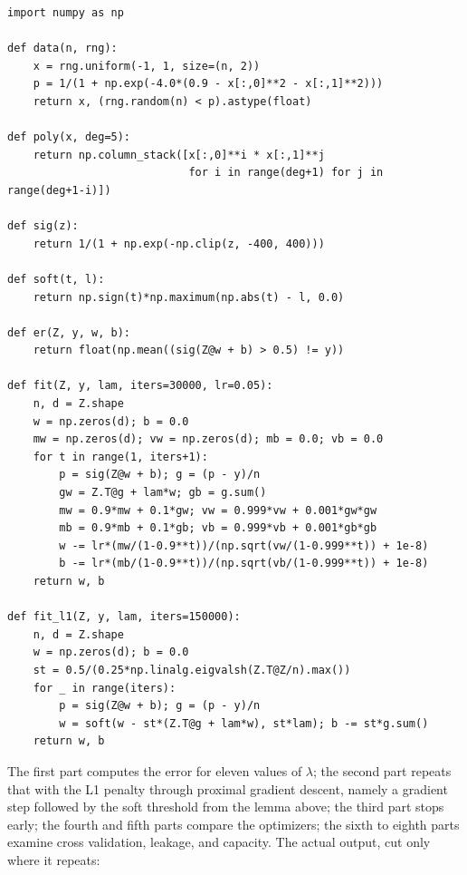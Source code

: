 \begin{lab}
\begin{verbatim}
import numpy as np

def data(n, rng):
    x = rng.uniform(-1, 1, size=(n, 2))
    p = 1/(1 + np.exp(-4.0*(0.9 - x[:,0]**2 - x[:,1]**2)))
    return x, (rng.random(n) < p).astype(float)

def poly(x, deg=5):
    return np.column_stack([x[:,0]**i * x[:,1]**j
                            for i in range(deg+1) for j in range(deg+1-i)])

def sig(z):
    return 1/(1 + np.exp(-np.clip(z, -400, 400)))

def soft(t, l):
    return np.sign(t)*np.maximum(np.abs(t) - l, 0.0)

def er(Z, y, w, b):
    return float(np.mean((sig(Z@w + b) > 0.5) != y))

def fit(Z, y, lam, iters=30000, lr=0.05):
    n, d = Z.shape
    w = np.zeros(d); b = 0.0
    mw = np.zeros(d); vw = np.zeros(d); mb = 0.0; vb = 0.0
    for t in range(1, iters+1):
        p = sig(Z@w + b); g = (p - y)/n
        gw = Z.T@g + lam*w; gb = g.sum()
        mw = 0.9*mw + 0.1*gw; vw = 0.999*vw + 0.001*gw*gw
        mb = 0.9*mb + 0.1*gb; vb = 0.999*vb + 0.001*gb*gb
        w -= lr*(mw/(1-0.9**t))/(np.sqrt(vw/(1-0.999**t)) + 1e-8)
        b -= lr*(mb/(1-0.9**t))/(np.sqrt(vb/(1-0.999**t)) + 1e-8)
    return w, b

def fit_l1(Z, y, lam, iters=150000):
    n, d = Z.shape
    w = np.zeros(d); b = 0.0
    st = 0.5/(0.25*np.linalg.eigvalsh(Z.T@Z/n).max())
    for _ in range(iters):
        p = sig(Z@w + b); g = (p - y)/n
        w = soft(w - st*(Z.T@g + lam*w), st*lam); b -= st*g.sum()
    return w, b
\end{verbatim}
\end{lab}

The first part computes the error for eleven values of $\lambda$; the second part repeats
that with the L1 penalty through proximal gradient descent, namely a gradient step
followed by the soft threshold from the lemma above; the third part stops early; the
fourth and fifth parts compare the optimizers; the sixth to eighth parts examine cross
validation, leakage, and capacity. The actual output, cut only where it repeats:

